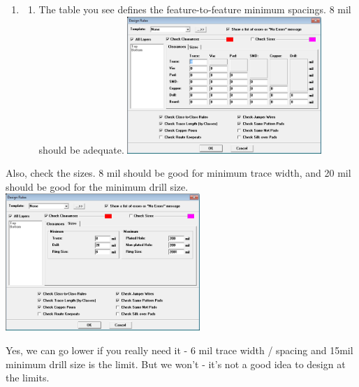 \documentclass[letterpaper]{article}
\newcounter{saveenum}
\newcommand\liststyleRTFNumvi{%
\renewcommand\theenumi{\arabic{enumi}}
\renewcommand\theenumii{\alph{enumii}}
\renewcommand\theenumiii{\roman{enumiii}}
\renewcommand\theenumiv{\arabic{enumiv}}
\renewcommand\labelenumi{\theenumi.}
\renewcommand\labelenumii{\theenumii.}
\renewcommand\labelenumiii{\theenumiii.}
\renewcommand\labelenumiv{\theenumiv.}
}
\begin{document}
\liststyleRTFNumvi
\setcounter{saveenum}{\value{enumi}}
\begin{enumerate}
\setcounter{enumi}{\value{saveenum}}
\item \setcounter{saveenum}{\value{enumii}}
\begin{enumerate}
\setcounter{enumii}{\value{saveenum}}
\item {\sffamily\color[rgb]{0.30980393,0.5058824,0.7411765}
The table you see defines the feature-to-feature minimum spacings. 8 mil should be adequate.\newline
 \includegraphics[width=2.8957in,height=2.0417in]{figures/ee4document-img023.png} }
\end{enumerate}
\end{enumerate}
{\sffamily\color[rgb]{0.30980393,0.5058824,0.7411765}
Also, check the sizes. 8 mil should be good for minimum trace width, and 20 mil should be good for the minimum drill
size.\newline
 \includegraphics[width=2.8957in,height=2.0417in]{figures/ee4document-img024.png} }

{\sffamily\color[rgb]{0.30980393,0.5058824,0.7411765}
Yes, we can go lower if you really need it - 6 mil trace width / spacing and 15mil minimum drill size is the limit. But
we won't - it's not a good idea to design at the limits.}
\end{document}
